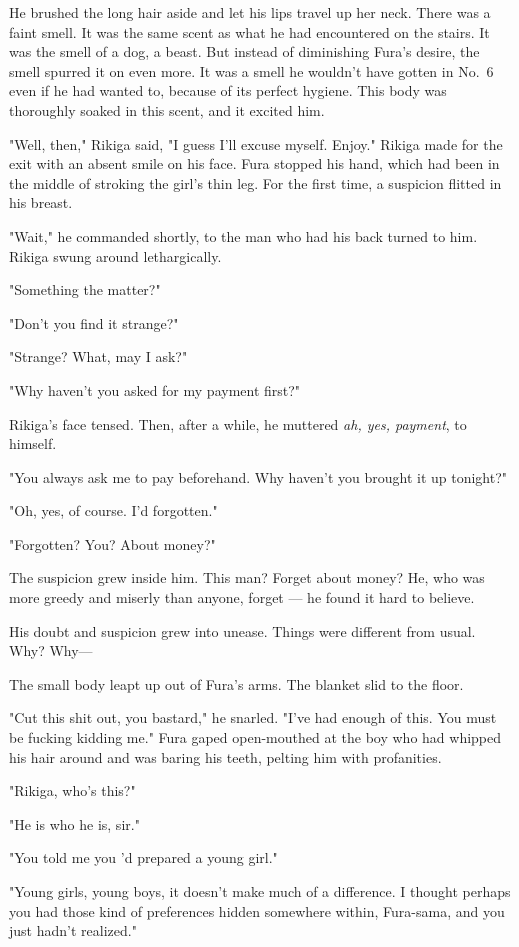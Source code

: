 He brushed the long hair aside and let his lips travel up her neck.
There was a faint smell. It was the same scent as what he had
encountered on the stairs. It was the smell of a dog, a beast. But
instead of diminishing Fura's desire, the smell spurred it on even more.
It was a smell he wouldn't have gotten in No.~6 even if he had wanted
to, because of its perfect hygiene. This body was thoroughly soaked in
this scent, and it excited him.

"Well, then," Rikiga said, "I guess I'll excuse myself. Enjoy." Rikiga
made for the exit with an absent smile on his face. Fura stopped his
hand, which had been in the middle of stroking the girl's thin leg. For
the first time, a suspicion flitted in his breast.

"Wait," he commanded shortly, to the man who had his back turned to him.
Rikiga swung around lethargically.

"Something the matter?"

"Don't you find it strange?"

"Strange? What, may I ask?"

"Why haven't you asked for my payment first?"

Rikiga's face tensed. Then, after a while, he muttered \emph{ah, yes, payment},
to himself.

"You always ask me to pay beforehand. Why haven't you brought it up
tonight?"

"Oh, yes, of course. I'd forgotten."

"Forgotten? You? About money?"

The suspicion grew inside him. This man? Forget about money? He, who was
more greedy and miserly than anyone, forget --- he found it hard to
believe.

His doubt and suspicion grew into unease. Things were different from
usual. Why? Why---

The small body leapt up out of Fura's arms. The blanket slid to the
floor.

"Cut this shit out, you bastard," he snarled. "I've had enough of this.
You must be fucking kidding me." Fura gaped open-mouthed at the boy who
had whipped his hair around and was baring his teeth, pelting him with
profanities.

"Rikiga, who's this?"

"He is who he is, sir."

"You told me you 'd prepared a young girl."

"Young girls, young boys, it doesn't make much of a difference. I
thought perhaps you had those kind of preferences hidden somewhere
within, Fura-sama, and you just hadn't realized."


